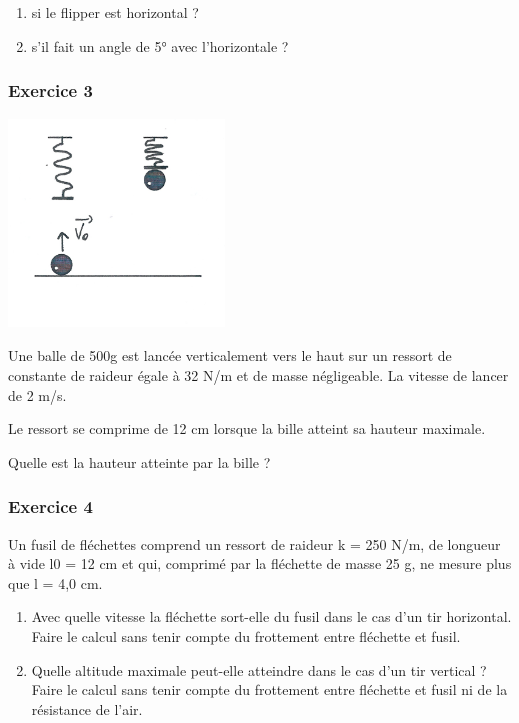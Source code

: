 \begin{multicols}{2}
\begin{enumerate}
\item si le flipper est horizontal ? 
\item s’il fait un angle de 5° avec l’horizontale ?
\end{enumerate}

\subsubsection{Exercice 3}
\begin{center}
\begin{minipage}{6.276cm}
 \includegraphics[width=5.75cm,height=5.539cm]{COURS2EnergieOHEXERCRESOL-img/COURS2EnergieOHEXERCRESOL-img004.png} 
\end{minipage}
\end{center}
Une balle de 500g est lancée verticalement vers le haut sur un ressort de constante de raideur égale à 32 N/m et de
masse négligeable. La vitesse de lancer de 2 m/s.

Le ressort se comprime de 12 cm lorsque la bille atteint sa hauteur maximale.

Quelle est la hauteur atteinte par la bille ? 

\subsubsection{Exercice 4}
Un fusil de fléchettes comprend un ressort de raideur k = 250 N/m, de longueur à vide l0 = 12 cm et qui, comprimé par la
fléchette de masse 25 g, ne mesure plus que l = 4,0 cm.

\begin{enumerate}
\item Avec quelle vitesse la fléchette sort-elle du fusil dans le cas d’un tir horizontal. Faire le calcul sans tenir
compte du frottement entre fléchette et fusil.
\item Quelle altitude maximale peut-elle atteindre dans le cas d’un tir vertical ? Faire le calcul sans tenir compte du
frottement entre fléchette et fusil ni de la résistance de l’air.
\end{enumerate}


\end{multicols}
